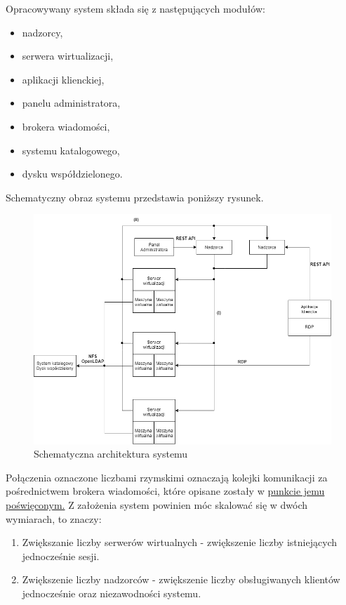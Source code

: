 \documentclass[../opis-rozwiazania.tex]{subfiles}
\begin{document}
Opracowywany system składa się z następujących modułów:

\begin{itemize}
    \item nadzorcy,
    \item serwera wirtualizacji,
    \item aplikacji klienckiej,
    \item panelu administratora,
    \item brokera wiadomości,
    \item systemu katalogowego,
    \item dysku współdzielonego.
\end{itemize}

Schematyczny obraz systemu przedstawia poniższy rysunek.

\begin{figure}[H]
    \centering
    \includegraphics[width=\textwidth]{../diagrams/architecture.png}
    \caption{Schematyczna architektura systemu}
\end{figure}

Połączenia oznaczone liczbami rzymskimi oznaczają kolejki komunikacji za pośrednictwem brokera wiadomości, które opisane zostały w \hyperref[modules:broker]{punkcie jemu poświęconym.} Z założenia system powinien móc skalować się w dwóch wymiarach, to znaczy:
\begin{enumerate}
    \item Zwiększanie liczby serwerów wirtualnych - zwiększenie liczby istniejących jednocześnie sesji.
    \item Zwiększenie liczby nadzorców - zwiększenie liczby obsługiwanych klientów jednocześnie oraz niezawodności systemu.
\end{enumerate}
\end{document}
